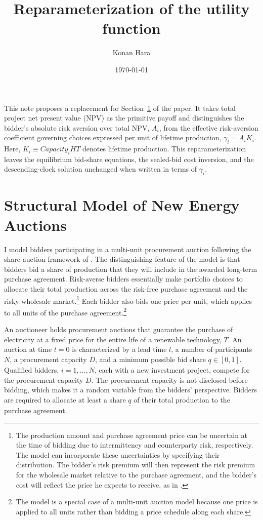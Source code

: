 \documentclass[10pt]{article}
\title{Reparameterization of the utility function}
\author{Konan Hara}
\date{\today}
\theoremstyle{plain}
\theoremstyle{definition}
\begin{document}
\maketitle

This note proposes a replacement for Section~\ref{sec:model} of the paper. It
takes total project net present value (NPV) as the primitive payoff and
distinguishes the bidder's absolute risk aversion over total NPV, $A_i$, from
the effective risk-aversion coefficient governing choices expressed per unit
of lifetime production, $\gamma_i=A_iK_i$. Here,
$K_i\equiv Capacity_iHT$ denotes lifetime production. This reparameterization
leaves the equilibrium bid-share equations, the sealed-bid cost inversion,
and the descending-clock solution unchanged when written in terms of
$\gamma_i$.

\section{Structural Model of New Energy Auctions}
\label{sec:model}

I model bidders participating in a multi-unit procurement auction following
the share auction framework of \citet{Wilson1979}. The distinguishing feature
of the model is that bidders bid a share of production that they will include
in the awarded long-term purchase agreement. Risk-averse bidders essentially
make portfolio choices to allocate their total production across the
risk-free purchase agreement and the risky wholesale market.\footnote{\label{fn:uncertainty}
The production amount and purchase agreement price can be uncertain at the
time of bidding due to intermittency and counterparty risk, respectively. The
model can incorporate these uncertainties by specifying their distribution.
The bidder's risk premium will then represent the risk premium for the
wholesale market relative to the purchase agreement, and the bidder's cost
will reflect the price he expects to receive, as in \citet{Ryan2026}.
} Each bidder also bids one price per unit, which applies to all units of the
purchase agreement.\footnote{
The model is a special case of a multi-unit auction model because one price is
applied to all units rather than bidding a price schedule along each share.
}

An auctioneer holds procurement auctions that guarantee the purchase of
electricity at a fixed price for the entire life of a renewable technology,
$T$. An auction at time $t=0$ is characterized by a lead time $l$, a number of
participants $N$, a procurement capacity $D$, and a minimum possible bid
share $\underline{q}\in[0,1]$. Qualified bidders, $i=1,\dots,N$, each with a
new investment project, compete for the procurement capacity $D$. The
procurement capacity is not disclosed before bidding, which makes it a random
variable from the bidders' perspective. Bidders are required to allocate at
least a share $\underline{q}$ of their total production to the purchase
agreement.
\end{document}
